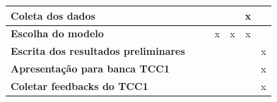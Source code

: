 \begin{table}[]
\begin{tabular}{|l|c|c|c|c|c|c|}
	\textbf{Coleta dos dados}                    &                                       &                                         &                                     &                                     & x                                  &                                     \\ \hline
	\textbf{Escolha do modelo}                   &                                       &                                         & x                                   & x                                   & x                                  &                                     \\ \hline
	\textbf{Escrita dos resultados preliminares} &                                       &                                         &                                     &                                     &                                    & x                                   \\ \hline
	\textbf{Apresentação para banca TCC1}        &                                       &                                         &                                     &                                     &                                    & x                                   \\ \hline
	\textbf{Coletar feedbacks do TCC1}           &                                       &                                         &                                     &                                     &                                    & x                                   \\ \hline
	\end{tabular}
\end{table}

